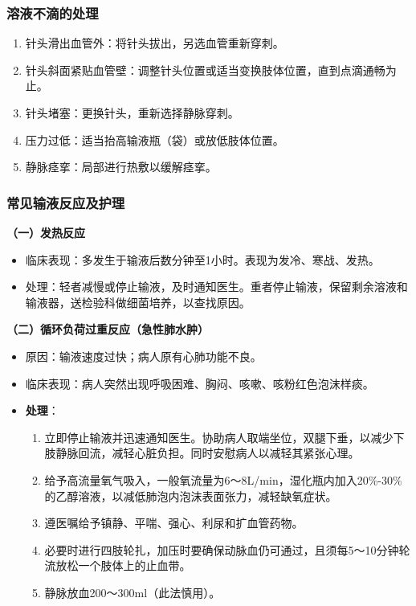 \documentclass[11pt, a4paper]{ctexart}
\begin{document}
\subsubsection{溶液不滴的处理}
\begin{enumerate}
    \item 针头滑出血管外：将针头拔出，另选血管重新穿刺。
    \item 针头斜面紧贴血管壁：调整针头位置或适当变换肢体位置，直到点滴通畅为止。
    \item 针头堵塞：更换针头，重新选择静脉穿刺。
    \item 压力过低：适当抬高输液瓶（袋）或放低肢体位置。
    \item 静脉痉挛：局部进行热敷以缓解痉挛。
\end{enumerate}

\subsubsection{常见输液反应及护理}
\textbf{（一）发热反应}
\begin{itemize}
    \item 临床表现：多发生于输液后数分钟至1小时。表现为发冷、寒战、发热。
    \item 处理：轻者减慢或停止输液，及时通知医生。重者停止输液，保留剩余溶液和输液器，送检验科做细菌培养，以查找原因。
\end{itemize}

\textbf{（二）循环负荷过重反应（急性肺水肿）}
\begin{itemize}
    \item 原因：输液速度过快；病人原有心肺功能不良。
    \item 临床表现：病人突然出现呼吸困难、胸闷、咳嗽、咳粉红色泡沫样痰。
    \item \textbf{处理}：
    \begin{enumerate}
        \item 立即停止输液并迅速通知医生。协助病人取端坐位，双腿下垂，以减少下肢静脉回流，减轻心脏负担。同时安慰病人以减轻其紧张心理。
        \item 给予高流量氧气吸入，一般氧流量为6～8L/min，湿化瓶内加入20\%-30\%的乙醇溶液，以减低肺泡内泡沫表面张力，减轻缺氧症状。
        \item 遵医嘱给予镇静、平喘、强心、利尿和扩血管药物。
        \item 必要时进行四肢轮扎，加压时要确保动脉血仍可通过，且须每5～10分钟轮流放松一个肢体上的止血带。
        \item 静脉放血200～300ml（此法慎用）。
    \end{enumerate}
\end{itemize}
\end{document}
